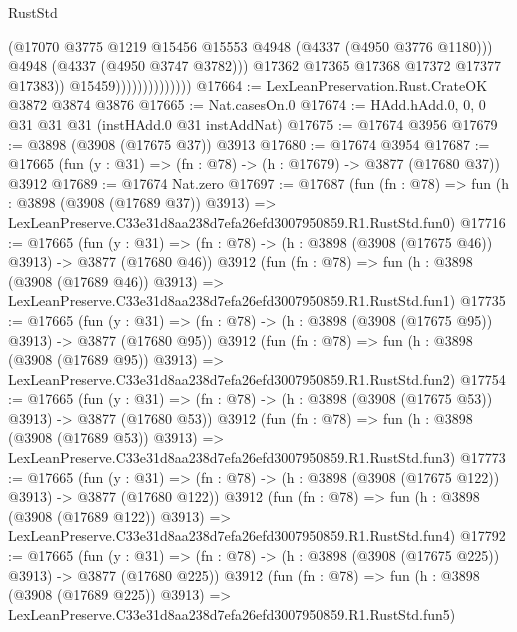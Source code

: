 \begin{lexlean}{RustStd}
\begin{coremodule}
                                      (@17070
                                        @3775
                                        @1219
                                        @15456
                                        @15553
                                        @4948
                                        (@4337 (@4950 @3776 @1180)))
                                      @4948
                                      (@4337 (@4950 @3747 @3782)))
                                    @17362
                                    @17365
                                    @17368
                                    @17372
                                    @17377
                                    @17383))
                                @15459))))))))))))))
@17664 := LexLeanPreservation.Rust.CrateOK @3872 @3874 @3876
@17665 := Nat.casesOn.{0}
@17674 := HAdd.hAdd.{0, 0, 0} @31 @31 @31 (instHAdd.{0} @31 instAddNat)
@17675 := @17674 @3956
@17679 := @3898 (@3908 (@17675 @37)) @3913
@17680 := @17674 @3954
@17687 := @17665 (fun (y : @31) => (fn : @78) -> (h : @17679) -> @3877 (@17680 @37)) @3912
@17689 := @17674 Nat.zero
@17697 := @17687
    (fun (fn : @78) =>
    fun (h : @3898 (@3908 (@17689 @37)) @3913) =>
    LexLeanPreserve.C33e31d8aa238d7efa26efd3007950859.R1.RustStd.fun0)
@17716 := @17665
    (fun (y : @31) => (fn : @78) -> (h : @3898 (@3908 (@17675 @46)) @3913) -> @3877 (@17680 @46))
    @3912
    (fun (fn : @78) =>
    fun (h : @3898 (@3908 (@17689 @46)) @3913) =>
    LexLeanPreserve.C33e31d8aa238d7efa26efd3007950859.R1.RustStd.fun1)
@17735 := @17665
    (fun (y : @31) => (fn : @78) -> (h : @3898 (@3908 (@17675 @95)) @3913) -> @3877 (@17680 @95))
    @3912
    (fun (fn : @78) =>
    fun (h : @3898 (@3908 (@17689 @95)) @3913) =>
    LexLeanPreserve.C33e31d8aa238d7efa26efd3007950859.R1.RustStd.fun2)
@17754 := @17665
    (fun (y : @31) => (fn : @78) -> (h : @3898 (@3908 (@17675 @53)) @3913) -> @3877 (@17680 @53))
    @3912
    (fun (fn : @78) =>
    fun (h : @3898 (@3908 (@17689 @53)) @3913) =>
    LexLeanPreserve.C33e31d8aa238d7efa26efd3007950859.R1.RustStd.fun3)
@17773 := @17665
    (fun (y : @31) => (fn : @78) -> (h : @3898 (@3908 (@17675 @122)) @3913) -> @3877 (@17680 @122))
    @3912
    (fun (fn : @78) =>
    fun (h : @3898 (@3908 (@17689 @122)) @3913) =>
    LexLeanPreserve.C33e31d8aa238d7efa26efd3007950859.R1.RustStd.fun4)
@17792 := @17665
    (fun (y : @31) => (fn : @78) -> (h : @3898 (@3908 (@17675 @225)) @3913) -> @3877 (@17680 @225))
    @3912
    (fun (fn : @78) =>
    fun (h : @3898 (@3908 (@17689 @225)) @3913) =>
    LexLeanPreserve.C33e31d8aa238d7efa26efd3007950859.R1.RustStd.fun5)

\end{coremodule}
\end{lexlean}
